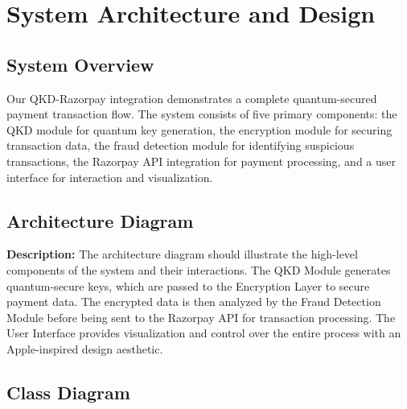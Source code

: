 \documentclass[conference]{IEEEtran}
\begin{document}
\section{System Architecture and Design}

\subsection{System Overview}
Our QKD-Razorpay integration demonstrates a complete quantum-secured payment transaction flow. The system consists of five primary components: the QKD module for quantum key generation, the encryption module for securing transaction data, the fraud detection module for identifying suspicious transactions, the Razorpay API integration for payment processing, and a user interface for interaction and visualization.

\subsection{Architecture Diagram}


\textbf{Description:} The architecture diagram should illustrate the high-level components of the system and their interactions. The QKD Module generates quantum-secure keys, which are passed to the Encryption Layer to secure payment data. The encrypted data is then analyzed by the Fraud Detection Module before being sent to the Razorpay API for transaction processing. The User Interface provides visualization and control over the entire process with an Apple-inspired design aesthetic.

\subsection{Class Diagram}
\end{document}
